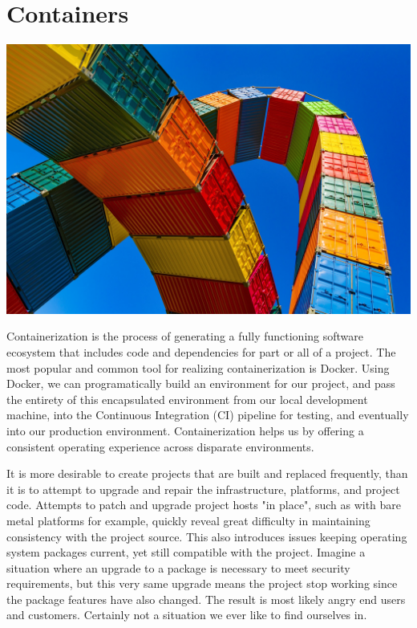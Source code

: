 \chapter{Containers}

\includegraphics[scale=0.85]{../images/container-4203677_1920.jpg}

\justify
Containerization is the process of generating a fully functioning
software ecosystem that includes code and dependencies for part or all
of a project. The most popular and common tool for realizing
containerization is Docker. Using Docker, we can programatically build
an environment for our project, and pass the entirety of this
encapsulated environment from our local development machine, into the
Continuous Integration (CI) pipeline for testing, and eventually into
our production environment. Containerization helps us by offering a
consistent operating experience across disparate environments.

\justify
It is more desirable to create projects that are built and replaced
frequently, than it is to attempt to upgrade and repair the
infrastructure, platforms, and project code. Attempts to patch and
upgrade project hosts "in place", such as with bare metal platforms for
example, quickly reveal great difficulty in maintaining consistency with
the project source. This also introduces issues keeping operating system
packages current, yet still compatible with the project. Imagine a situation where an upgrade to a package is necessary to meet security requirements, but this very same upgrade means the project stop working
since the package features have also changed. The result is most likely
angry end users and customers. Certainly not a situation we ever like to
find ourselves in.

